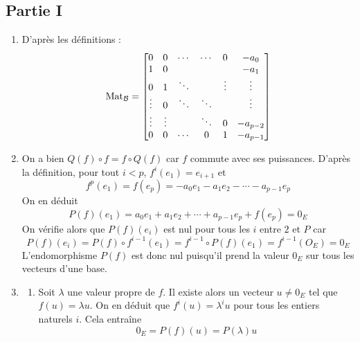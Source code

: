 \subsection*{Partie I}
\begin{enumerate}
 \item D'après les définitions :
\begin{displaymath}
 \operatorname{Mat}_{\mathcal B}=
\begin{bmatrix}
 0      & 0      & \cdots & \cdots & 0      & -a_0     \\
 1      & 0      &        &        &        & -a_1     \\
 0      & 1      & \ddots &        & \vdots & \vdots   \\
 \vdots & 0      & \ddots & \ddots &        & \vdots   \\
 \vdots & \vdots &        & \ddots & 0      & -a_{p-2} \\
 0      & 0      & \cdots & 0      & 1      & -a_{p-1} \\
\end{bmatrix}
\end{displaymath}
\item On a bien $Q(f)\circ f = f\circ Q(f)$ car $f$ commute avec ses puissances.\newline
D'après la définition, pour tout $i<p$, $f^i(e_1)=e_{i+1}$ et
\begin{displaymath}
 f^p(e_1)=f(e_p)= -a_0 e_1 -a_1e_2 - \cdots - a_{p-1}e_p
\end{displaymath}
On en déduit
\begin{displaymath}
 P(f)(e_1)= a_0 e_1 + a_1e_2 + \cdots + a_{p-1}e_p + f(e_p) = 0_E 
\end{displaymath}
On vérifie alors que $P(f)(e_i)$ est nul pour tous les $i$ entre $2$ et $P$ car
\begin{displaymath}
 P(f)(e_i)=P(f)\circ f^{i-1}(e_1)=f^{i-1}\circ P(f)(e_1)=f^{i-1}(O_E)=0_E
\end{displaymath}
L'endomorphisme $P(f)$ est donc nul puisqu'il prend la valeur $0_E$ sur tous les vecteurs d'une base.
\item \begin{enumerate}
 \item Soit $\lambda$ une valeur propre de $f$. Il existe alors un vecteur $u\neq 0_E$ tel que $f(u)=\lambda u$. On en déduit que $f^i(u)=\lambda^i u$ pour tous les entiers naturels $i$. Cela entraîne
\begin{displaymath}
 0_E=P(f)(u)=P(\lambda)u
\end{displaymath}

\end{enumerate}
\end{enumerate}
